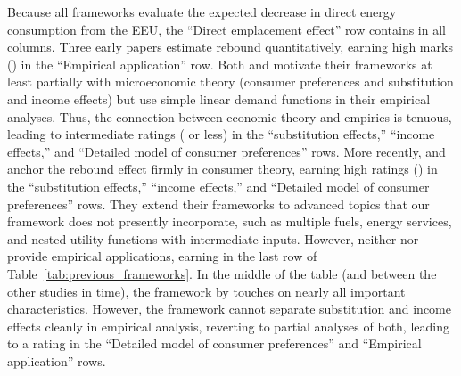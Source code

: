 \documentclass[12pt]{article}\usepackage[]{graphicx}\usepackage[]{xcolor}
\begin{document}
\renewcommand{\arraystretch}{0.6}



Because all frameworks evaluate the expected decrease 
in direct energy consumption from the EEU,
the ``Direct emplacement effect'' row contains  
in all columns.
Three early papers \citep{Nassen:2009aa, Thomas:2013aa, Thomas:2013ab}
estimate rebound quantitatively, 
earning high marks () in the ``Empirical application'' row. 
Both \citeauthor{Nassen:2009aa} and \citeauthor{Thomas:2013aa} 
motivate their frameworks at least partially with microeconomic theory
(consumer preferences and substitution and income effects)
but use simple linear demand functions in their empirical analyses.  
Thus, the connection between economic theory and empirics is tenuous, 
leading to intermediate ratings ( or less) in the
``substitution effects,''
``income effects,''
and
``Detailed model of consumer preferences'' rows.
More recently, \citet{Chan2015} and \citet{Wang2021}
anchor the rebound effect firmly in consumer theory, 
earning high ratings () in the
``substitution effects,''
``income effects,'' and 
``Detailed model of consumer preferences'' rows. 
They extend their frameworks to advanced topics
that our framework does not presently incorporate,
such as
multiple fuels,  
energy services, and
nested utility functions with intermediate inputs. 
However, neither \citeauthor{Chan2015} nor \citeauthor{Wang2021} 
provide empirical applications,
earning  in the last row of Table~\ref{tab:previous_frameworks}. 
In the middle of the table (and between the other studies in time), 
the framework by \citet{Borenstein:2015aa}
touches on nearly all important characteristics.
However, the \citeauthor{Borenstein:2015aa} framework
cannot separate substitution and income effects cleanly in empirical analysis, 
reverting to partial analyses of both, 
leading to a  rating in the ``Detailed model of consumer preferences'' 
and ``Empirical application'' rows.
\end{document}
